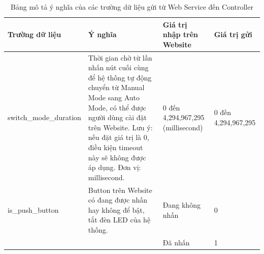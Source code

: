 \begin{table}[H]
\centering
\small
\begin{tabular}{|p{4cm}|p{5cm}|p{2.5cm}|p{3.5cm}|}
\hline
{\textbf{Trường dữ liệu}}            & {\textbf{Ý nghĩa}}                                                                                                                                                                                                                              & {\textbf{Giá trị nhập trên Website}} & {\textbf{Giá trị gửi}} \\ \hline
{switch\_mode\_duration}             & {Thời gian chờ từ lần nhấn nút cuối cùng để hệ thống tự động chuyển từ Manual Mode sang Auto Mode, có thể được người dùng cài đặt trên Website. Lưu ý: nếu đặt giá trị là 0, điều kiện timeout này sẽ không được áp dụng. Đơn vị: millisecond.} & {0 đến 4,294,967,295 (millisecond)}       & {0 đến 4,294,967,295}  \\ \hline

\multirow{-2}{*}[-0.25cm]{{is\_push\_button}} & {{Button trên Website có đang được nhấn hay không để bật, tắt đèn LED của hệ thống.}}                                                                                                                                           & {Đang không nhấn}                         & {0}                   \\ \cline{3-4}  {}                                   & {}                                                                                                                                                                                                                                              & {Đã nhấn}                                 & {1}                    
\\ \hline
\end{tabular}
\caption{Bảng mô tả ý nghĩa của các trường dữ liệu gửi từ Web Service đến Controller}
\label{tab:my_label}

\end{table}

